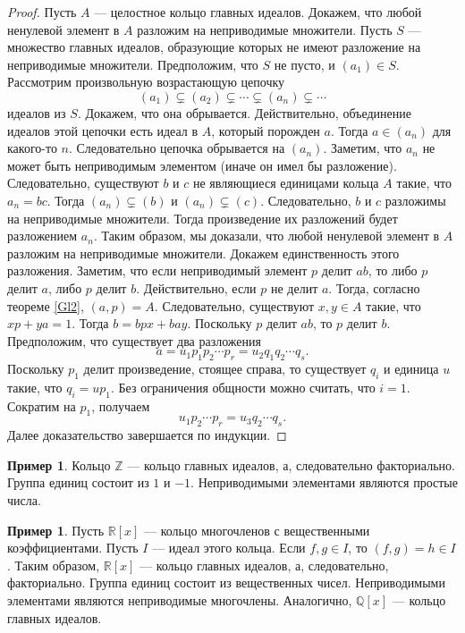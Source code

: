 \documentclass[12pt, titlepage, oneside]{amsbook}
\newcommand{\ZZ}{\mathbb{Z}}
\newcommand{\RR}{\mathbb{R}}
\newcommand{\QQ}{\mathbb{Q}}
\theoremstyle{definition}
\newtheorem{example}[theorem]{Пример}
\theoremstyle{remark}
\begin{document}
\begin{proof}
	Пусть $A$ --- целостное кольцо главных идеалов. Докажем, что любой ненулевой элемент в $A$ разложим на неприводимые множители. Пусть $S$ --- множество главных идеалов, образующие которых не имеют разложение на неприводимые множители. Предположим, что $S$ не пусто, и $(a_1)\in S$. Рассмотрим произвольную возрастающую цепочку $$(a_1)\subsetneq (a_2)\subsetneq\cdots\subsetneq(a_n)\subsetneq\cdots$$ идеалов из $S$. Докажем, что она обрывается. Действительно, объединение идеалов этой цепочки есть идеал в $A$, который порожден $a$. Тогда $a\in(a_n)$ для какого-то $n$. Следовательно цепочка обрывается на $(a_n)$. Заметим, что $a_n$ не может быть неприводимым элементом (иначе он имел бы разложение). Следовательно, существуют $b$ и $c$ не являющиеся единицами кольца $A$ такие, что $a_n=bc$. Тогда $(a_n)\subsetneq (b)$ и $(a_n)\subsetneq(c)$. Следовательно, $b$ и $c$ разложимы на неприводимые множители. Тогда произведение их разложений будет разложением $a_n$. Таким образом, мы доказали, что любой ненулевой элемент в $A$ разложим на неприводимые множители. Докажем единственность этого разложения. Заметим, что если неприводимый элемент $p$ делит $ab$, то либо $p$ делит $a$, либо $p$ делит $b$. Действительно, если $p$ не делит $a$. Тогда, согласно теореме \ref{Gl2}, $(a,p)=A$. Следовательно, существуют $x,y\in A$ такие, что $xp+ya=1$. Тогда $b=bpx+bay$. Поскольку $p$ делит $ab$, то $p$ делит $b$. Предположим, что существует два разложения $$a=u_1p_1p_2\cdots p_r=u_2 q_1q_2\cdots q_s.$$ Поскольку $p_1$ делит произведение, стоящее справа, то существует $q_i$ и единица $u$ такие, что $q_i=u p_1$. Без ограничения общности можно считать, что $i=1$. Сократим на $p_1$, получаем $$u_1p_2\cdots p_r=u_3 q_2\cdots q_s.$$ Далее доказательство завершается по индукции.
\end{proof}

\begin{example}
	Кольцо $\ZZ$ --- кольцо главных идеалов, а, следовательно факториально. Группа единиц состоит из $1$ и $-1$. Неприводимыми элементами являются простые числа.
\end{example}

\begin{example}
	Пусть $\RR[x]$ --- кольцо многочленов с вещественными коэффициентами. Пусть $I$ --- идеал этого кольца. Если $f,g\in I$, то $(f,g)=h\in I$. Таким образом, $\RR[x]$ --- кольцо главных идеалов, а, следовательно, факториально. Группа единиц состоит из вещественных чисел. Неприводимыми элементами являются неприводимые многочлены. Аналогично, $\QQ[x]$ --- кольцо главных идеалов.
\end{example}
\end{document}
